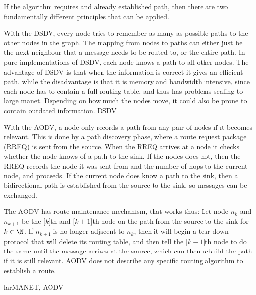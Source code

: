 If the algorithm requires and already established path, then there are two fundamentally different principles that can be applied.
\begin{description}
{With the DSDV, every node tries to remember as many as possible paths to the other nodes in the graph. The mapping from nodes to paths can either just be the next neighbour that a message needs to be routed to, or the entire path. In pure implementations of DSDV, each node knows a path to all other nodes. The advantage of DSDV is that when the information is correct it gives an efficient path, while the disadvantage is that it is memory and bandwidth intensive, since each node has to contain a full routing table, and thus has problems scaling to large \ac{manet}. Depending on how much the nodes move, it could also be prone to contain outdated information.
}
{DSDV}

{With the AODV, a node only records a path from any pair of nodes if it becomes relevant. This is done by a path discovery phase, where a route request package (RREQ) is sent from the source. When the RREQ arrives at a node it checks whether the node knows of a path to the sink. If the nodes does not, then the RREQ records the node it was sent from and the number of hops to the current node, and proceeds. If the current node does know a path to the sink, then a bidirectional path is established from the source to the sink, so messages can be exchanged.

The AODV has route maintenance mechanism, that works thus: Let node $n_k$ and $n_{k+1}$ be the [$k$]th and [$k+1$]th node on the path from the source to the sink for $k \in \N$. If $n_{k+1}$ is no longer adjacent to $n_{k}$, then it will begin a tear-down protocol that will delete its routing table, and then tell the [$k-1$]th node to do the same until the message arrives at the source, which can then rebuild the path if it is still relevant.
AODV does not describe any specific routing algorithm to establish a route.}
{larMANET, AODV}
\end{description}


